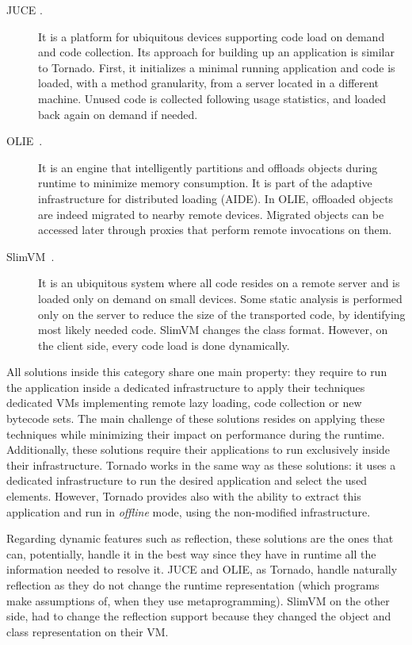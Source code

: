 \begin{description}
\item[JUCE \cite{Popa04a,Teod01a}.] It is a platform for ubiquitous devices supporting code load on demand and code collection. Its approach for building up an application is similar to Tornado. First, it initializes a minimal running application and code is loaded, with a method granularity, from a server located in a different machine. Unused code is collected following usage statistics, and loaded back again on demand if needed.

\item[OLIE~\cite{Gu03a}.] It is an engine that intelligently partitions and offloads objects during runtime to minimize memory consumption. It is part of the adaptive infrastructure for distributed loading (AIDE). In OLIE, offloaded objects are indeed migrated to nearby remote devices. Migrated objects can be accessed later through proxies that perform remote invocations on them.

\item[SlimVM~\cite{Kers09a, Wagn11a}.] It is an ubiquitous system where all code resides on a remote server and is loaded only on demand on small devices. Some static analysis is performed only on the server to reduce the size of the transported code, by identifying most likely needed code. SlimVM changes the class format. However, on the client side, every code load is done dynamically.

\end{description}

All solutions inside this category share one main property: they require to run the application inside a dedicated infrastructure to apply their techniques \eg dedicated VMs implementing remote lazy loading, code collection or new bytecode sets. The main challenge of these solutions resides on applying these techniques while minimizing their impact on performance during the runtime. Additionally, these solutions require their applications to run exclusively inside their infrastructure. Tornado works in the same way as these solutions: it uses a dedicated infrastructure to run the desired application and select the used elements.  However, Tornado provides also with the ability to extract this application and run in \emph{offline} mode, using the non-modified infrastructure.

Regarding dynamic features such as reflection, these solutions are the ones that can, potentially, handle it in the best way since they have in runtime all the information needed to resolve it. JUCE and OLIE, as Tornado, handle naturally reflection as they do not change the runtime representation (which programs make assumptions of, when they use metaprogramming). SlimVM on the other side, had to change the reflection support because they changed the object and class representation on their VM.

